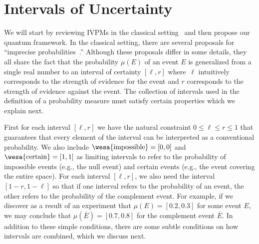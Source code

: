 \documentclass[english,reprint, aps, prl,superscriptaddress, showpacs,
showkeys, longbibliography, amsmath, amssymb]{revtex4-1}
\theoremstyle{plain}
\theoremstyle{definition}
\newcommand{\imposs}{{\text{\wesa{impossible}}}}
\newcommand{\necess}{{\text{\wesa{certain}}}}
\begin{document}
\section{Intervals of Uncertainty}
  
We will start by reviewing IVPMs in the classical setting~\cite{JamisonLodwick2004}
and then propose our quantum framework. In the classical setting,
there are several proposals for ``imprecise probabilities~\cite{Dempster1967,Artstein1972,Shafer1976,PuriRalescu1983,GilboaSchmeidler1994,Marinacci1999,Weichselberger2000,JamisonLodwick2004,Teran2014,Grabisch2016}.''
Although these proposals differ in some details, they all share the
fact that the probability $\mu(E)$ of an event $E$ is generalized
from a single real number to an interval of certainty $[\ell,r]$
where~$\ell$ intuitively corresponds to the strength of evidence
for the event and $r$ corresponds to the strength of evidence against
the event. The collection of intervals used in the definition of a
probability measure must satisfy certain properties which we explain
next.

First for each interval $[\ell,r]$ we have the natural constraint
$0 \leq \ell \leq r \leq 1$ that guarantees that every element of the
interval can be interpreted as a conventional probability. We also
include $\imposs=[0,0]$ and $\necess=[1,1]$ as limiting intervals to
refer to the probability of impossible events (e.g., the null event)
and certain events (e.g., the event covering the entire space). For
each interval $[\ell,r]$, we also need the interval $[1-r,1-\ell]$ so
that if one interval refers to the probability of an event, the other
refers to the probability of the complement event. For example, if we
discover as a result of an experiment that $\mu(E) = [0.2,0.3]$ for
some event $E$, we may conclude that $\mu(\overline{E}) = [0.7,0.8]$
for the complement event $\overline{E}$. In addition to these simple
conditions, there are some subtle conditions on how intervals are
combined, which we discuss next.
\end{document}
